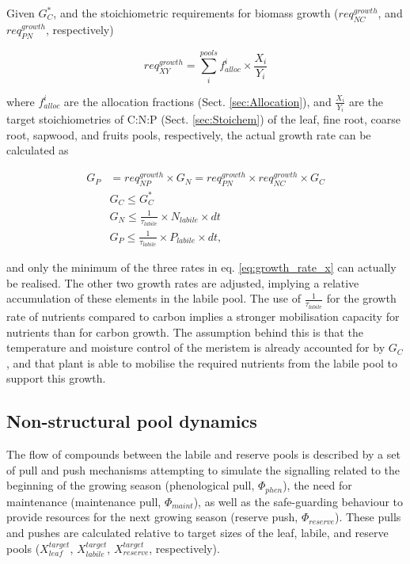 Given $G^{*}_C$, and the stoichiometric requirements for biomass growth ($req^{growth}_{NC}$, and $req^{growth}_{PN}$, respectively) 

\begin{equation}
req^{growth}_{XY} = \sum^{pools}_{i}{f^{i}_{alloc} \times \frac{X_i}{Y_i}}
\end{equation}

where $f^{i}_{alloc}$ are the allocation fractions (Sect. \ref{sec:Allocation}), and $\frac{X_i}{Y_i}$ are the target stoichiometries of C:N:P (Sect. \ref{sec:Stoichem}) of the leaf, fine root, coarse root, sapwood, and fruits pools, respectively, the actual growth rate can be calculated as

\begin{subequations}\label{eq:growth_rate}
\begin{align}
G_P &= req^{growth}_{NP} \times G_N = req^{growth}_{PN} \times req^{growth}_{NC} \times G_C \label{eq:growth_rate_x} \\
&G_C \le G^{*}_C \\
&G_N \le \frac{1}{\tau_{labile}} \times N_{labile} \times dt \\
&G_P \le \frac{1}{\tau_{labile}} \times P_{labile} \times dt,
\end{align} 
\end{subequations}

and only the minimum of the three rates in eq. \ref{eq:growth_rate_x} can actually be realised. The other two growth rates are adjusted, implying a relative accumulation of these elements in the labile pool. The use of $\frac{1}{\tau_{labile}}$ for the growth rate of nutrients compared to carbon implies a stronger mobilisation capacity for nutrients than for carbon growth. The assumption behind this is that the temperature and moisture control of the meristem is already accounted for by $G_C$, and that plant is able to mobilise the required nutrients from the labile pool to support this growth.

\subsection{Non-structural pool dynamics}\label{sec:Reserve}

The flow of compounds between the labile and reserve pools is described by a set of pull and push mechanisms attempting to simulate the signalling related to the beginning of the growing season (phenological pull, $\Phi_{phen}$), the need for maintenance (maintenance pull, $\Phi_{maint}$), as well as the safe-guarding behaviour to provide resources for the next growing season (reserve push, $\Phi_{reserve}$). These pulls and pushes are calculated relative to target sizes of the leaf, labile, and reserve pools ($X^{target}_{leaf}$, $X^{target}_{labile}$, $X^{target}_{reserve}$, respectively). 

